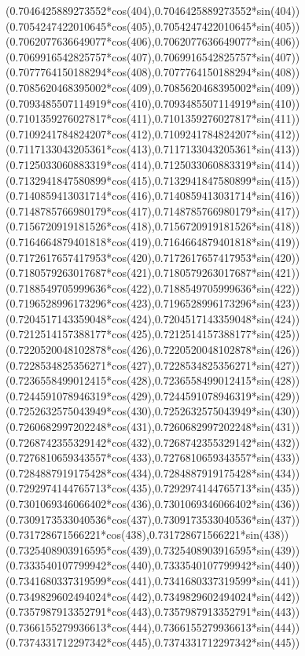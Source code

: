 {({0.7046425889273552*cos(404)},{0.7046425889273552*sin(404)})
({0.7054247422010645*cos(405)},{0.7054247422010645*sin(405)})
({0.7062077636649077*cos(406)},{0.7062077636649077*sin(406)})
({0.7069916542825757*cos(407)},{0.7069916542825757*sin(407)})
({0.7077764150188294*cos(408)},{0.7077764150188294*sin(408)})
({0.7085620468395002*cos(409)},{0.7085620468395002*sin(409)})
({0.7093485507114919*cos(410)},{0.7093485507114919*sin(410)})
({0.7101359276027817*cos(411)},{0.7101359276027817*sin(411)})
({0.7109241784824207*cos(412)},{0.7109241784824207*sin(412)})
({0.7117133043205361*cos(413)},{0.7117133043205361*sin(413)})
({0.7125033060883319*cos(414)},{0.7125033060883319*sin(414)})
({0.7132941847580899*cos(415)},{0.7132941847580899*sin(415)})
({0.7140859413031714*cos(416)},{0.7140859413031714*sin(416)})
({0.7148785766980179*cos(417)},{0.7148785766980179*sin(417)})
({0.7156720919181526*cos(418)},{0.7156720919181526*sin(418)})
({0.7164664879401818*cos(419)},{0.7164664879401818*sin(419)})
({0.7172617657417953*cos(420)},{0.7172617657417953*sin(420)})
({0.7180579263017687*cos(421)},{0.7180579263017687*sin(421)})
({0.7188549705999636*cos(422)},{0.7188549705999636*sin(422)})
({0.7196528996173296*cos(423)},{0.7196528996173296*sin(423)})
({0.7204517143359048*cos(424)},{0.7204517143359048*sin(424)})
({0.7212514157388177*cos(425)},{0.7212514157388177*sin(425)})
({0.7220520048102878*cos(426)},{0.7220520048102878*sin(426)})
({0.7228534825356271*cos(427)},{0.7228534825356271*sin(427)})
({0.7236558499012415*cos(428)},{0.7236558499012415*sin(428)})
({0.7244591078946319*cos(429)},{0.7244591078946319*sin(429)})
({0.7252632575043949*cos(430)},{0.7252632575043949*sin(430)})
({0.7260682997202248*cos(431)},{0.7260682997202248*sin(431)})
({0.7268742355329142*cos(432)},{0.7268742355329142*sin(432)})
({0.7276810659343557*cos(433)},{0.7276810659343557*sin(433)})
({0.7284887919175428*cos(434)},{0.7284887919175428*sin(434)})
({0.7292974144765713*cos(435)},{0.7292974144765713*sin(435)})
({0.7301069346066402*cos(436)},{0.7301069346066402*sin(436)})
({0.7309173533040536*cos(437)},{0.7309173533040536*sin(437)})
({0.731728671566221*cos(438)},{0.731728671566221*sin(438)})
({0.7325408903916595*cos(439)},{0.7325408903916595*sin(439)})
({0.7333540107799942*cos(440)},{0.7333540107799942*sin(440)})
({0.7341680337319599*cos(441)},{0.7341680337319599*sin(441)})
({0.7349829602494024*cos(442)},{0.7349829602494024*sin(442)})
({0.7357987913352791*cos(443)},{0.7357987913352791*sin(443)})
({0.7366155279936613*cos(444)},{0.7366155279936613*sin(444)})
({0.7374331712297342*cos(445)},{0.7374331712297342*sin(445)})
}
